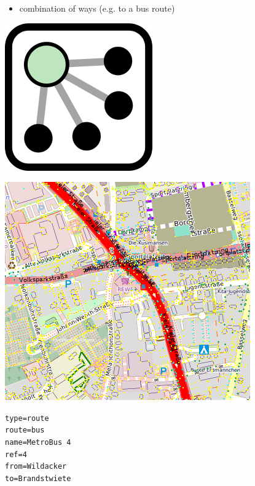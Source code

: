 \documentclass{beamer}
\begin{document}
	\begin{frame}
		\begin{itemize}
			\item combination of ways (e.g. to a bus route)
		\end{itemize}
		
		\vfill
		
		\begin{center}
			\begin{minipage}[b][0.6\textheight][c]{0.15\linewidth}
				\centering
				\includegraphics[width=0.5\linewidth,height=0.5\textheight,keepaspectratio]{images/240px-Mf_Relation.png}
			\end{minipage}
			\begin{minipage}[b][0.6\textheight][c]{0.5\linewidth}
				\centering
				\includegraphics[width=0.8\linewidth,height=0.8\textheight,keepaspectratio]{images/relations_example.png}
			\end{minipage}
			\begin{minipage}[b][0.6\textheight][c]{0.3\linewidth}
				\texttt{type=route}\\
				\texttt{route=bus}\\
				\texttt{name=MetroBus 4}\\
				\texttt{ref=4}\\
				\texttt{from=Wildacker}\\
				\texttt{to=Brandstwiete}
			\end{minipage}
		\end{center}
	\end{frame}
	
\end{document}
